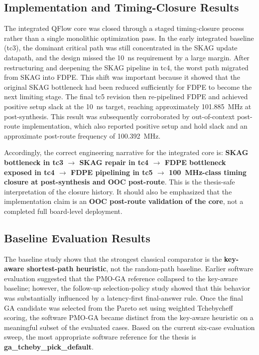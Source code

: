 \subsection{Implementation and Timing-Closure Results}

The integrated QFlow core was closed through a staged timing-closure process rather than a single monolithic optimization pass. In the early integrated baseline (tc3), the dominant critical path was still concentrated in the SKAG update datapath, and the design missed the 10~ns requirement by a large margin. After restructuring and deepening the SKAG pipeline in tc4, the worst path migrated from SKAG into FDPE. This shift was important because it showed that the original SKAG bottleneck had been reduced sufficiently for FDPE to become the next limiting stage. The final tc5 revision then re-pipelined FDPE and achieved positive setup slack at the 10~ns target, reaching approximately 101.885~MHz at post-synthesis. This result was subsequently corroborated by out-of-context post-route implementation, which also reported positive setup and hold slack and an approximate post-route frequency of 100.392~MHz.

Accordingly, the correct engineering narrative for the integrated core is: \textbf{SKAG bottleneck in tc3 $\rightarrow$ SKAG repair in tc4 $\rightarrow$ FDPE bottleneck exposed in tc4 $\rightarrow$ FDPE pipelining in tc5 $\rightarrow$ 100~MHz-class timing closure at post-synthesis and OOC post-route}. This is the thesis-safe interpretation of the closure history. It should also be emphasized that the implementation claim is an \textbf{OOC post-route validation of the core}, not a completed full board-level deployment.

\subsection{Baseline Evaluation Results}

The baseline study shows that the strongest classical comparator is the \textbf{key-aware shortest-path heuristic}, not the random-path baseline. Earlier software evaluation suggested that the PMO-GA reference collapsed to the key-aware baseline; however, the follow-up selection-policy study showed that this behavior was substantially influenced by a latency-first final-answer rule. Once the final GA candidate was selected from the Pareto set using weighted Tchebycheff scoring, the software PMO-GA became distinct from the key-aware heuristic on a meaningful subset of the evaluated cases. Based on the current six-case evaluation sweep, the most appropriate software reference for the thesis is \textbf{ga\_tcheby\_pick\_default}.

